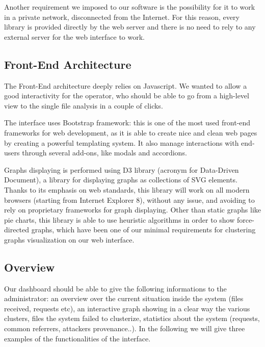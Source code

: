 Another requirement we imposed to our software is the possibility for it to work in a private network, disconnected from the Internet. For this reason, every library is provided directly by the web server and there is no need to rely to any external server for the web interface to work.

\subsection{Front-End Architecture}

The Front-End architecture deeply relies on Javascript. We wanted to allow a good interactivity for the operator, who should be able to go from a high-level view to the single file analysis in a couple of clicks.

The interface uses Bootstrap \cite{bootstrap} framework: this is one of the most used front-end frameworks for web development, as it is able to create nice and clean web pages by creating a powerful templating system. It also manage interactions with end-users through several add-ons, like modals and accordions.

Graphs displaying is performed using D3 library \cite{d3_home} (acronym for Data-Driven Document), a library for displaying graphs as collections of SVG elements. Thanks to its emphasis on web standards, this library will work on all modern browsers (starting from Internet Explorer 8), without any issue, and avoiding to rely on proprietary frameworks for graph displaying. Other than static graphs like pie charts, this library is able to use heuristic algorithms in order  to show force-directed graphs, which have been one of our minimal requirements for clustering graphs visualization on our web interface.

\subsection{Overview}

Our dashboard should be able to give the following informations to the administrator: an overview over the current situation inside the system (files received, requests etc), an interactive graph showing in a clear way the various clusters, files the system failed to clusterize, statistics about the system (requests, common referrers, attackers provenance..). In the following we will give three examples of the functionalities of the interface.

